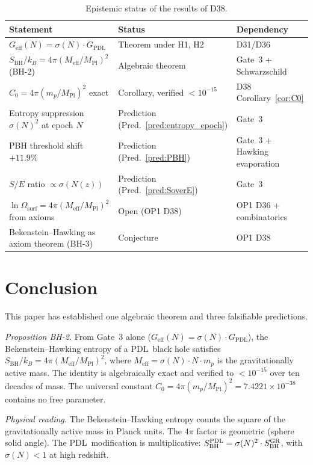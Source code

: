 \documentclass[11pt,a4paper]{article}
\theoremstyle{definition}
\newcommand{\PDL}{\textnormal{PDL}}
\newcommand{\sig}{\sigma}
\newcommand{\GPDL}{G_{\mathrm{PDL}}}
\newcommand{\Geff}{G_{\mathrm{eff}}}
\newcommand{\SBH}{S_{\mathrm{BH}}}
\newcommand{\Meff}{M_{\mathrm{eff}}}
\newcommand{\MPl}{M_{\mathrm{Pl}}}
\newcommand{\Omsurf}{\Omega_{\mathrm{surf}}}
\begin{document}
\begin{table}[ht]
\centering
\caption{Epistemic status of the results of D38.}
\label{tab:epistemic}
\medskip
\begin{tabular}{>{\raggedright}p{6.5cm}p{3.2cm}p{3.5cm}}
\toprule
Statement & Status & Dependency \\
\midrule
$\Geff(N) = \sig(N)\cdot\GPDL$
  & Theorem under H1, H2 & D31/D36 \\[3pt]
$\SBH/k_B = 4\pi(\Meff/\MPl)^2$ (BH-2)
  & Algebraic theorem & Gate~3 + Schwarzschild \\[3pt]
$C_0 = 4\pi(m_p/\MPl)^2$ exact
  & Corollary, verified $<10^{-15}$
  & D38 Corollary~\ref{cor:C0} \\[3pt]
Entropy suppression $\sig(N)^2$ at epoch $N$
  & Prediction (Pred.~\ref{pred:entropy_epoch})
  & Gate~3 \\[3pt]
PBH threshold shift $+11.9\%$
  & Prediction (Pred.~\ref{pred:PBH})
  & Gate~3 + Hawking evaporation \\[3pt]
$S/E$ ratio $\propto\sig(N(z))$
  & Prediction (Pred.~\ref{pred:SoverE})
  & Gate~3 \\[3pt]
$\ln\Omsurf = 4\pi(\Meff/\MPl)^2$ from axioms
  & Open (OP1 D38)
  & OP1 D36 + combinatorics \\[3pt]
Bekenstein--Hawking as axiom theorem (BH-3)
  & Conjecture
  & OP1 D38 \\
\bottomrule
\end{tabular}
\end{table}

\section*{Conclusion}

This paper has established one algebraic theorem and three falsifiable
predictions.

\emph{Proposition BH-2.} From Gate~3 alone ($\Geff(N) = \sig(N)\cdot\GPDL$),
the Bekenstein--Hawking entropy of a \PDL\ black hole satisfies
$\SBH/k_B = 4\pi(\Meff/\MPl)^2$, where $\Meff = \sig(N)\cdot N\cdot m_p$
is the gravitationally active mass. The identity is algebraically exact and
verified to $<10^{-15}$ over ten decades of mass. The universal constant
$C_0 = 4\pi(m_p/\MPl)^2 = 7.4221\times10^{-38}$ contains no free parameter.

\emph{Physical reading.} The Bekenstein--Hawking entropy counts the square
of the gravitationally active mass in Planck units. The $4\pi$ factor is
geometric (sphere solid angle). The \PDL\ modification is multiplicative:
$\SBH^\PDL = \sig(N)^2\cdot\SBH^\mathrm{GR}$, with $\sig(N) < 1$ at high
redshift.
\end{document}
